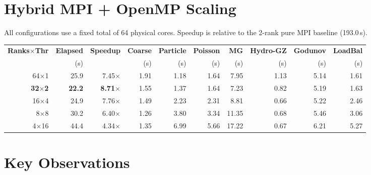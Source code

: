 \documentclass[11pt,fleqn]{book}
\begin{document}
\section{Hybrid MPI + OpenMP Scaling}

All configurations use a fixed total of 64 physical cores.  Speedup is relative to the 2-rank pure MPI baseline (193.0\,s).

\begin{center}
\begin{tabular}{rrrrrrrrrr}
\toprule
\textbf{Ranks$\times$Thr} & \textbf{Elapsed} & \textbf{Speedup} & \textbf{Coarse} & \textbf{Particle} & \textbf{Poisson} & \textbf{MG} & \textbf{Hydro-GZ} & \textbf{Godunov} & \textbf{LoadBal} \\
 & (s) & & (s) & (s) & (s) & (s) & (s) & (s) & (s) \\
\midrule
64$\times$1  & 25.9 & 7.45$\times$ & 1.91 & 1.18 & 1.64 & 7.95  & 1.13 & 5.14 & 1.61 \\
\textbf{32$\times$2}  & \textbf{22.2} & \textbf{8.71$\times$} & 1.55 & 1.37 & 1.64 & 7.23  & 0.82 & 5.19 & 1.63 \\
16$\times$4  & 24.9 & 7.76$\times$ & 1.49 & 2.23 & 2.31 & 8.81  & 0.66 & 5.22 & 2.46 \\
8$\times$8   & 30.2 & 6.40$\times$ & 1.26 & 3.80 & 3.34 & 11.35 & 0.68 & 5.46 & 3.06 \\
4$\times$16  & 44.4 & 4.34$\times$ & 1.35 & 6.99 & 5.66 & 17.22 & 0.67 & 6.21 & 5.27 \\
\bottomrule
\end{tabular}
\end{center}

\section{Key Observations}
\end{document}
